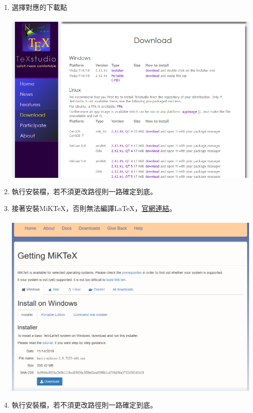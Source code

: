 \documentclass[12pt]{article}
\begin{document}
\begin{CJK*}{UTF8}{bsmi}
\begin{enumerate}[1.]
				\newpage
				\item 選擇對應的下載點 \\ \\
				\includegraphics[scale=0.7]{TeXStudio_download}
				
				\newpage
				\item 執行安裝檔，若不須更改路徑則一路確定到底。
				\item 接著安裝MiKTeX，否則無法編譯LaTeX，\href{https://miktex.org/download}{官網連結}。 \\ \\
				\includegraphics[scale=0.7]{MiK_download}
				\item 執行安裝檔，若不須更改路徑則一路確定到底。
			\end{enumerate}
		
		\newpage
		

\end{CJK*}
\end{document}
